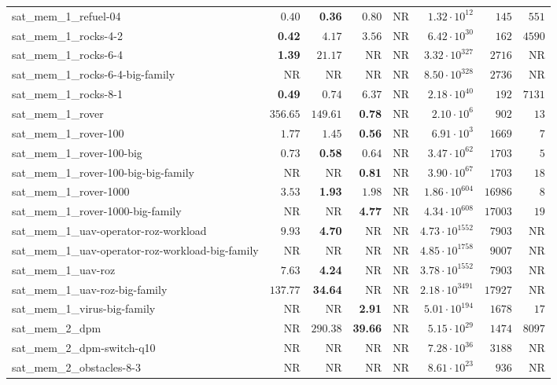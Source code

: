 \begin{tabular}{lrrrrrrr}
sat\_mem\_1\_refuel-04 & $0.40$ & \textbf{0.36} & $0.80$ & NR & $1.32\cdot 10^{12}$ & $145$ & $551$ \\
sat\_mem\_1\_rocks-4-2 & \textbf{0.42} & $4.17$ & $3.56$ & NR & $6.42\cdot 10^{30}$ & $162$ & $4590$ \\
sat\_mem\_1\_rocks-6-4 & \textbf{1.39} & $21.17$ & NR & NR & $3.32\cdot 10^{327}$ & $2716$ & NR \\
sat\_mem\_1\_rocks-6-4-big-family & NR & NR & NR & NR & $8.50\cdot 10^{328}$ & $2736$ & NR \\
sat\_mem\_1\_rocks-8-1 & \textbf{0.49} & $0.74$ & $6.37$ & NR & $2.18\cdot 10^{40}$ & $192$ & $7131$ \\
sat\_mem\_1\_rover & $356.65$ & $149.61$ & \textbf{0.78} & NR & $2.10\cdot 10^{6}$ & $902$ & $13$ \\
sat\_mem\_1\_rover-100 & $1.77$ & $1.45$ & \textbf{0.56} & NR & $6.91\cdot 10^{3}$ & $1669$ & $7$ \\
sat\_mem\_1\_rover-100-big & $0.73$ & \textbf{0.58} & $0.64$ & NR & $3.47\cdot 10^{62}$ & $1703$ & $5$ \\
sat\_mem\_1\_rover-100-big-big-family & NR & NR & \textbf{0.81} & NR & $3.90\cdot 10^{67}$ & $1703$ & $18$ \\
sat\_mem\_1\_rover-1000 & $3.53$ & \textbf{1.93} & $1.98$ & NR & $1.86\cdot 10^{604}$ & $16986$ & $8$ \\
sat\_mem\_1\_rover-1000-big-family & NR & NR & \textbf{4.77} & NR & $4.34\cdot 10^{608}$ & $17003$ & $19$ \\
sat\_mem\_1\_uav-operator-roz-workload & $9.93$ & \textbf{4.70} & NR & NR & $4.73\cdot 10^{1552}$ & $7903$ & NR \\
sat\_mem\_1\_uav-operator-roz-workload-big-family & NR & NR & NR & NR & $4.85\cdot 10^{1758}$ & $9007$ & NR \\
sat\_mem\_1\_uav-roz & $7.63$ & \textbf{4.24} & NR & NR & $3.78\cdot 10^{1552}$ & $7903$ & NR \\
sat\_mem\_1\_uav-roz-big-family & $137.77$ & \textbf{34.64} & NR & NR & $2.18\cdot 10^{3491}$ & $17927$ & NR \\
sat\_mem\_1\_virus-big-family & NR & NR & \textbf{2.91} & NR & $5.01\cdot 10^{194}$ & $1678$ & $17$ \\
sat\_mem\_2\_dpm & NR & $290.38$ & \textbf{39.66} & NR & $5.15\cdot 10^{29}$ & $1474$ & $8097$ \\
sat\_mem\_2\_dpm-switch-q10 & NR & NR & NR & NR & $7.28\cdot 10^{36}$ & $3188$ & NR \\
sat\_mem\_2\_obstacles-8-3 & NR & NR & NR & NR & $8.61\cdot 10^{23}$ & $936$ & NR \\

\end{tabular}
